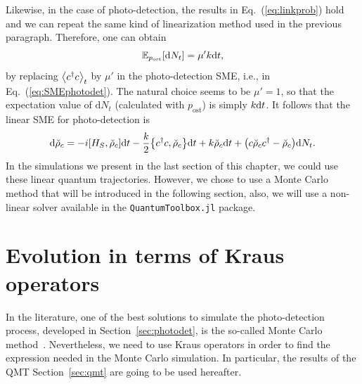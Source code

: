 Likewise, in the case of photo-detection, the results in Eq.~(\ref{eq:linkprob}) hold and we can repeat the same kind of linearization method used in the previous paragraph. Therefore, one can obtain
\begin{equation}
    \mathbb{E}_{p_\text{ost}}\qty[\mathrm{d}N_t]=\mu'k\mathrm{d}t,
\end{equation}
by replacing $\expval{c^\dagger c}_t$ by $\mu'$ in the photo-detection SME, i.e., in Eq.~(\ref{eq:SMEphotodet}). The natural choice seems to be $\mu'=1$, so that the expectation value of $\mathrm{d}N_t$ (calculated with $p_\mathrm{ost}$) is simply $k\mathrm{d}t$. It follows that the linear SME for photo-detection is
\begin{equation}
    \mathrm{d}\breve{\rho}_c = -i\qty[H_S, \breve{\rho}_c]\mathrm{d}t - \frac{k}{2}\qty{c^\dagger c,\breve{\rho}_c}\mathrm{d}t + k\breve{\rho}_c\mathrm{d}t +\qty(c\breve{\rho}_c c^\dagger-\breve{\rho}_c)\mathrm{d}N_t.
\end{equation}
In the simulations we present in the last section of this chapter, we could use these linear quantum trajectories. However, we chose to use a Monte Carlo method that will be introduced in the following section, also, we will use a non-linear solver available in the \verb|QuantumToolbox.jl| package.

\section{Evolution in terms of Kraus operators}
In the literature, one of the best solutions to simulate the photo-detection process, developed in Section~\ref{sec:photodet}, is the so-called Monte Carlo method~\cite{WM}. Nevertheless, we need to use Kraus operators in order to find the expression needed in the Monte Carlo simulation. In particular, the results of the QMT Section~\ref{sec:qmt} are going to be used hereafter.
